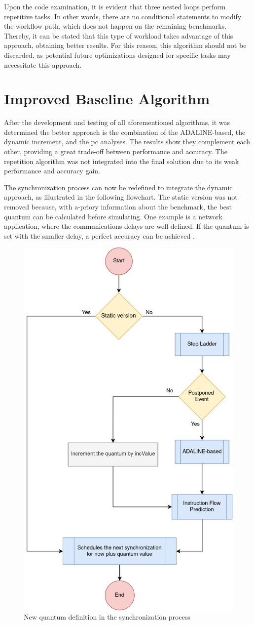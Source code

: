 Upon the code examination, it is evident that three nested loops perform repetitive tasks. In other words, there are no conditional 
statements to modify the workflow path, which does not happen on the remaining benchmarks. Thereby, it can be stated that this type of 
workload takes advantage of this approach, obtaining better results. For this reason, this algorithm should not be discarded, as potential 
future optimizations designed for specific tasks may necessitate this approach.

\section{Improved Baseline Algorithm}
\label{subsec::finalAlgorithm}

After the development and testing of all aforementioned algorithms, it was determined the better approach is the combination of the ADALINE-based, 
the dynamic increment, and the \gls{pc} analyses. The results show they complement each other, providing a great trade-off between performance 
and accuracy. The repetition algorithm was not integrated into the final solution due to its weak performance and accuracy gain. 

The synchronization process can now be redefined to integrate the dynamic approach, as illustrated in the following flowchart. 
The static version was not removed because, with a-priory information about the benchmark, 
the best quantum can be calculated before simulating. One example is a network application, where the communications delays are well-defined. 
If the quantum is set with the smaller delay, a perfect accuracy can be achieved \cite{dist-gem5}. 

\begin{figure}[H]
	\centering
 	\includegraphics[width=0.4\linewidth]{Images/NewGlobalSyncEventStatic.png}
 	\caption{New quantum definition in the synchronization process}
	\label{fig_NewGlobalSyncEventStatic}
\end{figure}

